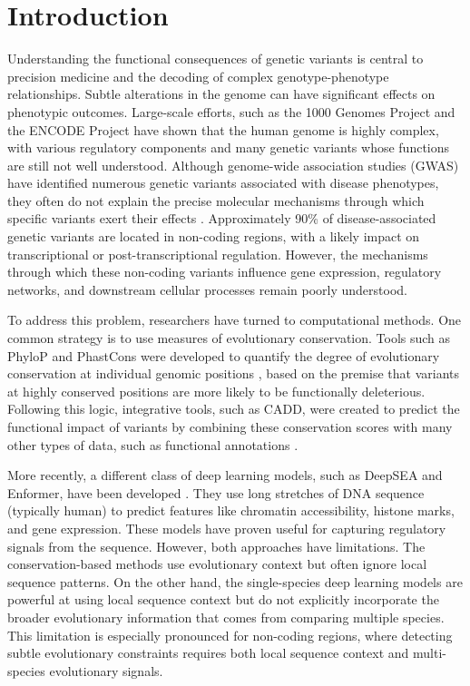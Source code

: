 \documentclass[unnumsec,webpdf,contemporary,large]{oup-authoring-template}%
\theoremstyle{thmstyleone}%
\theoremstyle{thmstyletwo}%
\theoremstyle{thmstylethree}%
\begin{document}
\section{Introduction}
Understanding the functional consequences of genetic variants is central to precision medicine and the decoding of complex genotype-phenotype relationships. Subtle alterations in the genome can have significant effects on phenotypic outcomes. Large-scale efforts, such as the 1000 Genomes Project and the ENCODE Project \citep{siva20081000, encode2012integrated} have shown that the human genome is highly complex, with various regulatory components and many genetic variants whose functions are still not well understood.
Although genome-wide association studies (GWAS) have identified numerous genetic variants associated with disease phenotypes, they often do not explain the precise molecular mechanisms through which specific variants exert their effects \citep{uffelmann2021gwas}. Approximately 90\% of disease-associated genetic variants are located in non-coding regions, with a likely impact on transcriptional or post-transcriptional regulation. However, the mechanisms through which these non-coding variants influence gene expression, regulatory networks, and downstream cellular processes remain poorly understood.

To address this problem, researchers have turned to computational methods. One common strategy is to use measures of evolutionary conservation. Tools such as PhyloP and PhastCons were developed to quantify the degree of evolutionary conservation at individual genomic positions \citep{siepel2005evolutionarily, pollard2010detection}, based on the premise that variants at highly conserved positions are more likely to be functionally deleterious. Following this logic, integrative tools, such as CADD, were created to predict the functional impact of variants by combining these conservation scores with many other types of data, such as functional annotations \citep{kircher2014general}.

More recently, a different class of deep learning models, such as DeepSEA and Enformer, have been developed \citep{zhou2015predicting,avsec2021effective}. They use long stretches of DNA sequence (typically human) to predict features like chromatin accessibility, histone marks, and gene expression. These models have proven useful for capturing regulatory signals from the sequence. However, both approaches have limitations. The conservation-based methods use evolutionary context but often ignore local sequence patterns. On the other hand, the single-species deep learning models are powerful at using local sequence context but do not explicitly incorporate the broader evolutionary information that comes from comparing multiple species. This limitation is especially pronounced for non-coding regions, where detecting subtle evolutionary constraints requires both local sequence context and multi-species evolutionary signals.
\end{document}
